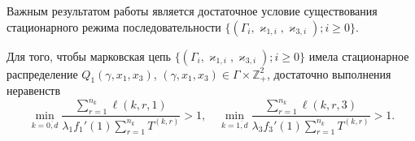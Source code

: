 Важным результатом работы является достаточное условие существования стационарного режима последовательности $\{(\Gamma_i,  \varkappa_{1, i}, \varkappa_{3, i}); i \geqslant 0\}$.
\begin{theorem}
Для того,  чтобы марковская цепь $\{(\Gamma_i,  \varkappa_{1, i}, \varkappa_{3, i}); i \geqslant 0\}$ имела стационарное распределение $Q_1(\gamma, x_1, x_3)$,  $(\gamma, x_1, x_3)\in \Gamma \times {\mathbb Z}^2_+$,  достаточно выполнения неравенств
\begin{equation}
\min_{k=\overline{0, d}} { \frac{\sum_{r = 1}^{n_k} \ell(k, r, 1) }{\lambda_1 f_1'(1) \sum_{r=1}^{n_k} T^{(k, r)} }}>1,  \quad 
\min_{k=\overline{1, d}} { \frac{\sum_{r = 1}^{n_k} \ell(k, r, 3) }{\lambda_3 f_3'(1) \sum_{r=1}^{n_k} T^{(k, r)} }}>1.
\label{sufficient:double}
\end{equation}
\label{sufficient:double:theorem}
\end{theorem}

